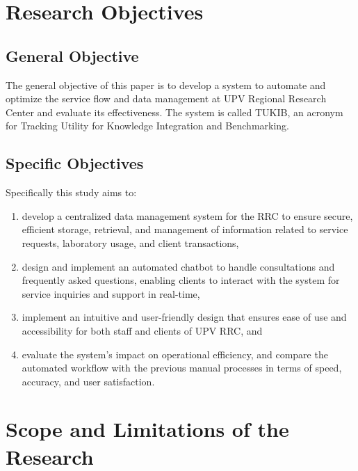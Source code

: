 \section{Research Objectives}
\label{sec:researchobjectives}

\subsection{General Objective}
\label{sec:generalobjective}

The general objective of this paper is to develop a system to automate and optimize the service flow and data management at UPV Regional Research Center and evaluate its effectiveness. The system is called TUKIB, an acronym for Tracking Utility for Knowledge Integration and Benchmarking. 

\subsection{Specific Objectives}
\label{sec:specificobjectives}

Specifically this study aims to:

\begin{enumerate}
	
	\item develop a centralized data management system for the RRC to ensure secure, efficient storage, retrieval, and management of information related to service requests, laboratory usage, and client transactions,
	
	\item design and implement an automated chatbot to handle consultations and frequently asked questions, enabling clients to interact with the system for service inquiries and support in real-time,
	
	
	\item implement an intuitive and user-friendly design that ensures ease of use and accessibility for both staff and clients of UPV RRC, and
	
	\item evaluate the system’s impact on operational efficiency, and compare the automated workflow with the previous manual processes in terms of speed, accuracy, and user satisfaction.
	
\end{enumerate}

\section{Scope and Limitations of the Research}
\label{sec:scopelimitations}

